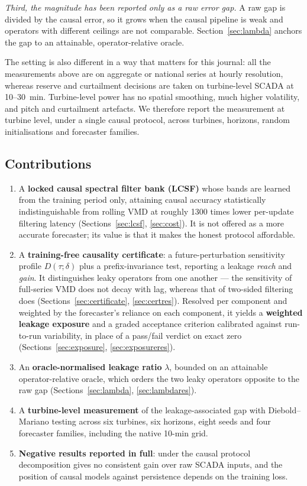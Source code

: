 \documentclass[review,3p,times]{elsarticle}
\begin{document}
\emph{Third, the magnitude has been reported only as a raw error gap.} A raw
gap is divided by the causal error, so it grows when the causal pipeline is
weak and operators with different ceilings are not comparable.
Section~\ref{sec:lambda} anchors the gap to an attainable, operator-relative
oracle.

The setting is also different in a way that matters for this journal:
all the measurements above are on aggregate or national series at hourly
resolution, whereas reserve and curtailment decisions are taken on
turbine-level SCADA at 10--30~min. Turbine-level power has no spatial
smoothing, much higher volatility, and pitch and curtailment artefacts. We
therefore report the measurement at turbine level, under a single causal
protocol, across turbines, horizons, random initialisations and forecaster
families.

\subsection{Contributions}

\begin{enumerate}
\item A \textbf{locked causal spectral filter bank (LCSF)} whose bands are
learned from the training period only, attaining causal accuracy
statistically indistinguishable from rolling VMD at roughly 1300 times lower
per-update filtering latency (Sections~\ref{sec:lcsf}, \ref{sec:cost}).
It is not offered as a more accurate forecaster; its value is that it makes
the honest protocol affordable.
\item A \textbf{training-free causality certificate}: a future-perturbation
sensitivity profile $D(\tau;\delta)$ plus a prefix-invariance test, reporting
a leakage \emph{reach} and \emph{gain}. It distinguishes leaky operators from
one another --- the sensitivity of full-series VMD does not decay with lag,
whereas that of two-sided filtering does (Sections~\ref{sec:certificate},
\ref{sec:certres}). Resolved per component and weighted by the forecaster's
reliance on each component, it yields a \textbf{weighted leakage exposure} and
a graded acceptance criterion calibrated against run-to-run variability, in
place of a pass/fail verdict on exact zero
(Sections~\ref{sec:exposure}, \ref{sec:exposureres}).
\item An \textbf{oracle-normalised leakage ratio} $\lambda$, bounded on an
attainable operator-relative oracle, which orders the two leaky operators
opposite to the raw gap (Sections~\ref{sec:lambda}, \ref{sec:lambdares}).
\item A \textbf{turbine-level measurement} of the leakage-associated gap with
Diebold--Mariano testing across six turbines, six horizons, eight seeds and
four forecaster families, including the native 10-min grid.
\item \textbf{Negative results reported in full}: under the causal protocol
decomposition gives no consistent gain over raw SCADA inputs, and the position
of causal models against persistence depends on the training loss.
\end{enumerate}
\end{document}
